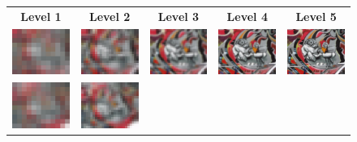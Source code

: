 \begin{figure}[h]
    \setlength\tabcolsep{2.5pt}
    \begin{center}
        \begin{tabular}{c c c c c}
        \textbf{Level 1} & \textbf{Level 2} & \textbf{Level 3} & \textbf{Level 4} & \textbf{Level 5} \\
        \includegraphics[width=2.2cm]{main/chapter03/data/homography/img_src_1.jpg} &
        \includegraphics[width=2.2cm]{main/chapter03/data/homography/img_src_2.jpg} &
        \includegraphics[width=2.2cm]{main/chapter03/data/homography/img_src_3.jpg} &
        \includegraphics[width=2.2cm]{main/chapter03/data/homography/img_src_4.jpg} &
        \includegraphics[width=2.2cm]{main/chapter03/data/homography/img_src_5.jpg} \\
        \includegraphics[width=2.2cm]{main/chapter03/data/homography/img_dst_1.jpg} &
        \includegraphics[width=2.2cm]{main/chapter03/data/homography/img_dst_2.jpg} &

\end{tabular}
\end{center}
\end{figure}
